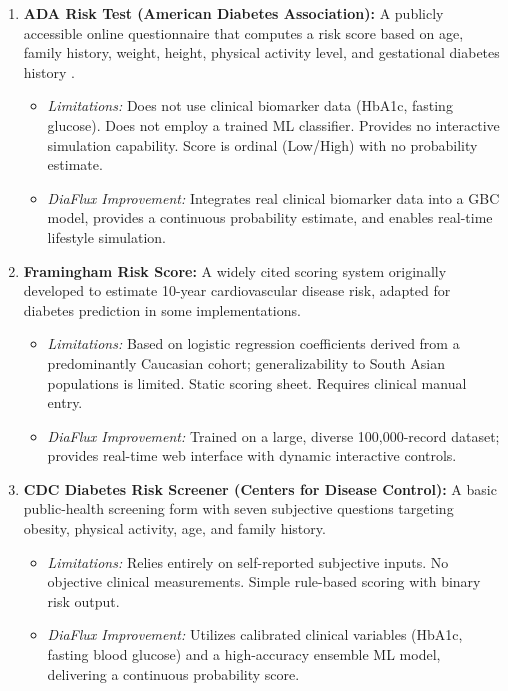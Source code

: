 \documentclass[12pt,a4paper]{report}
\begin{document}
\begin{enumerate}
    \item \textbf{ADA Risk Test (American Diabetes Association):} A publicly accessible online questionnaire that computes a risk score based on age, family history, weight, height, physical activity level, and gestational diabetes history \cite{ada_standards_2023}.
    \begin{itemize}
        \item \textit{Limitations:} Does not use clinical biomarker data (HbA1c, fasting glucose). Does not employ a trained ML classifier. Provides no interactive simulation capability. Score is ordinal (Low/High) with no probability estimate.
        \item \textit{DiaFlux Improvement:} Integrates real clinical biomarker data into a GBC model, provides a continuous probability estimate, and enables real-time lifestyle simulation.
    \end{itemize}

    \item \textbf{Framingham Risk Score:} A widely cited scoring system originally developed to estimate 10-year cardiovascular disease risk, adapted for diabetes prediction in some implementations.
    \begin{itemize}
        \item \textit{Limitations:} Based on logistic regression coefficients derived from a predominantly Caucasian cohort; generalizability to South Asian populations is limited. Static scoring sheet. Requires clinical manual entry.
        \item \textit{DiaFlux Improvement:} Trained on a large, diverse 100,000-record dataset; provides real-time web interface with dynamic interactive controls.
    \end{itemize}

    \item \textbf{CDC Diabetes Risk Screener (Centers for Disease Control):} A basic public-health screening form with seven subjective questions targeting obesity, physical activity, age, and family history.
    \begin{itemize}
        \item \textit{Limitations:} Relies entirely on self-reported subjective inputs. No objective clinical measurements. Simple rule-based scoring with binary risk output.
        \item \textit{DiaFlux Improvement:} Utilizes calibrated clinical variables (HbA1c, fasting blood glucose) and a high-accuracy ensemble ML model, delivering a continuous probability score.
    \end{itemize}


\end{enumerate}
\end{document}
